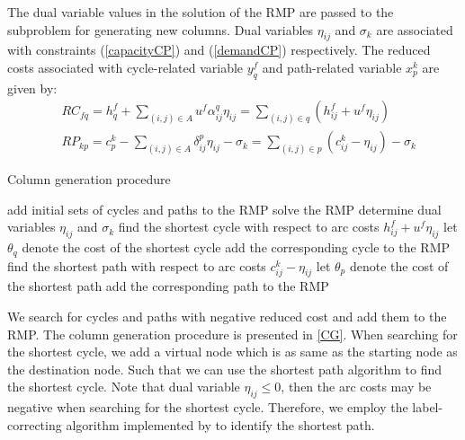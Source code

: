 \documentclass[11pt,nonblindrev,fleqn]{article}
\begin{document}
The dual variable values in the solution of the RMP are passed to the subproblem for generating new columns. Dual variables $\eta_{ij}$ and $\sigma_k$ are associated with constraints (\ref{capacityCP}) and (\ref{demandCP}) respectively. The reduced costs associated with cycle-related variable $y_q^f$ and path-related variable $x_p^k$ are given by:
\begin{align}
& RC_{fq} = h_q^f + \sum_{(i,j)\in A} u^f \alpha_{ij}^q \eta_{ij} = \sum_{(i,j)\in q} (h_{ij}^f + u^f \eta_{ij}) \\
& RP_{kp} = c_p^k - \sum_{(i,j)\in A} \delta_{ij}^p \eta_{ij} - \sigma_k = \sum_{(i,j)\in p} (c_{ij}^k - \eta_{ij}) - \sigma_k
\end{align}

\vspace{.05in}
\begin{algorithm}[H]
\caption{Column generation procedure}\label{CG}
\LinesNumbered
\SetNlSkip{1.2em}
add initial sets of cycles and paths to the RMP\;
{
    solve the RMP\;
    determine dual variables $\eta_{ij}$ and $\sigma_k$\;
    {
        find the shortest cycle with respect to arc costs $h_{ij}^f + u^f \eta_{ij}$\;
        let $\theta_q$ denote the cost of the shortest cycle\;
        {
            add the corresponding cycle to the RMP\;
        }
    }
    {
        find the shortest path with respect to arc costs $c_{ij}^k - \eta_{ij}$\;
        let $\theta_p$ denote the cost of the shortest path\;
        {
            add the corresponding path to the RMP\;
        }
    }
}
\end{algorithm}
\vspace{.1in}

We search for cycles and paths with negative reduced cost and add them to the RMP. The column generation procedure is presented in \autoref{CG}. When searching for the shortest cycle, we add a virtual node which is as same as the starting node as the destination node. Such that we can use the shortest path algorithm to find the shortest cycle. Note that dual variable $\eta_{ij} \leq 0$, then the arc costs may be negative when searching for the shortest cycle. Therefore, we employ the label-correcting algorithm implemented by \cite{Ahuja1993Network} to identify the shortest path.
\end{document}
